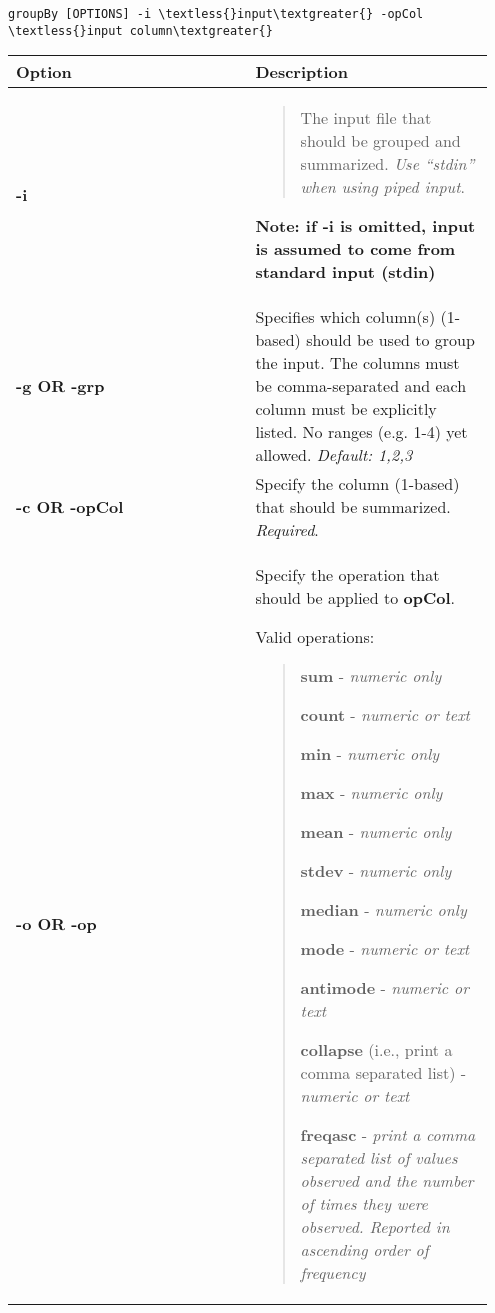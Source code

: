 \documentclass[letterpaper,10pt,english]{sphinxmanual}
\begin{document}
\begin{Verbatim}[commandchars=\\\{\}]
groupBy [OPTIONS] -i \textless{}input\textgreater{} -opCol \textless{}input column\textgreater{}
\end{Verbatim}

\begin{tabular}{|p{0.475\linewidth}|p{0.475\linewidth}|}
\hline
\textbf{
Option
} & \textbf{
Description
}\\\hline

\textbf{-i}
 & \begin{quote}

The input file that should be grouped and summarized. \emph{Use ``stdin'' when using piped input}.
\end{quote}

\textbf{Note: if -i is omitted, input is assumed to come from standard input (stdin)}
\\\hline

\textbf{-g OR -grp}
 & 
Specifies which column(s) (1-based) should be used to group the input. The columns must be comma-separated and each column must be explicitly listed. No ranges (e.g. 1-4) yet allowed. \emph{Default: 1,2,3}
\\\hline

\textbf{-c OR -opCol}
 & 
Specify the column (1-based) that should be summarized. \emph{Required}.
\\\hline

\textbf{-o OR -op}
 & 
Specify the operation that should be applied to \textbf{opCol}.

\begin{DUlineblock}{0em}
\item[] Valid operations:
\end{DUlineblock}
\begin{quote}

\begin{DUlineblock}{0em}
\item[] \textbf{sum} - \emph{numeric only}
\item[] \textbf{count} - \emph{numeric or text}
\item[] \textbf{min} - \emph{numeric only}
\item[] \textbf{max} - \emph{numeric only}
\item[] \textbf{mean} - \emph{numeric only}
\item[] \textbf{stdev} - \emph{numeric only}
\item[] \textbf{median} - \emph{numeric only}
\item[] \textbf{mode} - \emph{numeric or text}
\item[] \textbf{antimode} - \emph{numeric or text}
\item[] \textbf{collapse} (i.e., print a comma separated list) - \emph{numeric or text}
\item[] \textbf{freqasc} - \emph{print a comma separated list of values observed and the number of times they were observed. Reported in ascending order of frequency}
\end{DUlineblock}
\end{quote}


\end{tabular}
\end{document}
